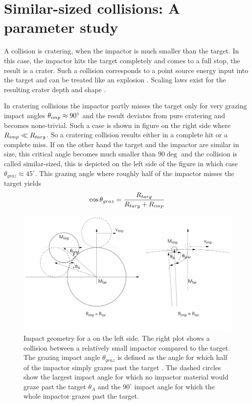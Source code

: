 \newpage
\chapter{Similar-sized collisions: A parameter study}
\graphicspath{{./03figs/}}

A collision is cratering, when the impactor is much smaller than the target. In this case, the impactor hits the target completely and comes to a full stop, the result is a crater. Such a collision corresponds to a point source energy input into the target and can be treated like an explosion \citep{Melosh:2007p3502}. Scaling laws exist for the resulting crater depth and shape \citep{Holsapple:1993p3018}. 

In cratering collisions the impactor partly misses the target only for very grazing impact angles $\theta_{imp} \approx 90 ^\circ$ and the result deviates from pure cratering and becomes none-trivial. Such a case is shown in figure \label{ch03_fig03} on the right side where $R_{imp} \ll R_{targ}$. So a cratering collision results either in a complete hit or a complete miss. If on the other hand the target and the impactor are similar in size, this critical angle becomes much smaller than $90 \deg$ and the collision is called similar-sized, this is depicted on the left side of the figure in which case $\theta_{graz} \approx 45^\circ$. This grazing angle where roughly half of the impactor misses the target yields
\begin{equation}
\label{ch03_eq001}
\cos{ \theta_{graz} }= \frac{R_{targ}}{R_{targ} + R_{imp}}
\end{equation}

\begin{figure}[htbp]
\begin{center}
\includegraphics[scale=0.4]{03_grazing}
\caption{Impact geometry for a \SSC on the left side. The right plot shows a collision between a relatively small impactor compared to the target. The grazing impact angle $\theta_{graz}$ is defined as the angle for which half of the impactor simply grazes past the target \citep{Asphaug:2010p3539}. The dashed circles show the largest impact angle for which no impactor material would graze past the target $\theta_A$ and the $90^\circ$ impact angle for which the whole impactor grazes past the target.}
\label{ch03_fig03}
\end{center}
\end{figure}

